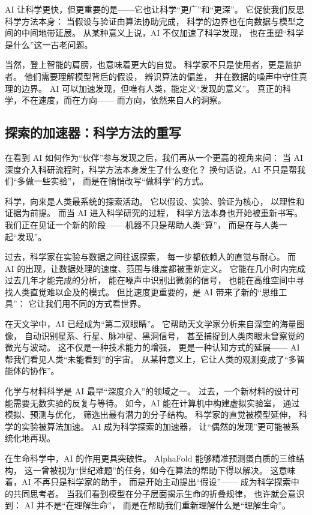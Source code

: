 AI 让科学更快，但更重要的是——它也让科学“更广”和“更深”。  
它促使我们反思科学方法本身：  
当假设与验证由算法协助完成，  
科学的边界也在向数据与模型之间的中间地带延展。  
从某种意义上说，AI 不仅加速了科学发现，  
也在重塑“科学是什么”这一古老问题。

当然，登上智能的肩膀，也意味着更大的自觉。  
科学家不只是使用者，更是监护者。  
他们需要理解模型背后的假设，  
辨识算法的偏差，  
并在数据的噪声中守住真理的边界。  
AI 可以加速发现，但唯有人类，能定义“发现的意义”。  
真正的科学，不在速度，而在方向——  
而方向，依然来自人的洞察。

\subsection{探索的加速器：科学方法的重写}

在看到 AI 如何作为“伙伴”参与发现之后，我们再从一个更高的视角来问：  
当 AI 深度介入科研流程时，科学方法本身发生了什么变化？  
换句话说，AI 不只是帮我们“多做一些实验”，  
而是在悄悄改写“做科学”的方式。

科学，向来是人类最系统的探索活动。  
它以假设、实验、验证为核心，  
以理性和证据为前提。  
而当 AI 进入科学研究的过程，  
科学方法本身也开始被重新书写。  
我们正在见证一个新的阶段——  
机器不只是帮助人类“算”，  
而是在与人类一起“发现”。

过去，科学家在实验与数据之间往返探索，  
每一步都依赖人的直觉与耐心。  
而 AI 的出现，让数据处理的速度、范围与维度都被重新定义。  
它能在几小时内完成过去几年才能完成的分析，  
能在噪声中识别出微弱的信号，  
也能在高维空间中寻找人类直觉难以企及的模式。  
但比速度更重要的，是 AI 带来了新的“思维工具”：  
它让我们用不同的方式看世界。

在天文学中，AI 已经成为“第二双眼睛”。  
它帮助天文学家分析来自深空的海量图像，  
自动识别星系、行星、脉冲星、黑洞信号，  
甚至捕捉到人类肉眼未曾察觉的微光与波动。  
这不仅是一种技术能力的增强，  
更是一种认知方式的延展——  
AI 帮我们看见人类“未能看到”的宇宙。  
从某种意义上，它让人类的观测变成了“多智能体的协作”。

化学与材料科学是 AI 最早“深度介入”的领域之一。  
过去，一个新材料的设计可能需要无数实验的反复与等待。  
如今，AI 能在计算机中构建虚拟实验室，  
通过模拟、预测与优化，  
筛选出最有潜力的分子结构。  
科学家的直觉被模型延伸，  
科学的实验被算法加速。  
AI 成为科学探索的加速器，  
让“偶然的发现”更可能被系统化地再现。

在生命科学中，AI 的作用更具突破性。  
AlphaFold 能够精准预测蛋白质的三维结构，  
这一曾被视为“世纪难题”的任务，如今在算法的帮助下得以解决。  
这意味着，AI 不再只是科学家的助手，  
而是开始主动提出“假设”——  
成为科学探索中的共同思考者。  
当我们看到模型在分子层面揭示生命的折叠规律，  
也许就会意识到：  
AI 并不是“在理解生命”，  
而是在帮助我们重新理解什么是“理解生命”。

